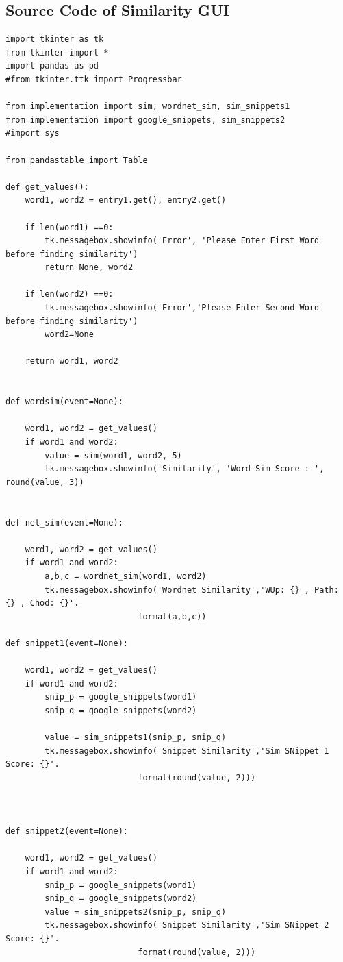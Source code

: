 \documentclass[conference]{IEEEtran}
\begin{document}
\newpage
\begin{appendices}
\section{Source Code of Similarity GUI}\label{sec:append}
\begin{lstlisting}
import tkinter as tk
from tkinter import *
import pandas as pd
#from tkinter.ttk import Progressbar

from implementation import sim, wordnet_sim, sim_snippets1
from implementation import google_snippets, sim_snippets2
#import sys

from pandastable import Table

def get_values():
    word1, word2 = entry1.get(), entry2.get()
    
    if len(word1) ==0:
        tk.messagebox.showinfo('Error', 'Please Enter First Word before finding similarity')
        return None, word2
        
    if len(word2) ==0:
        tk.messagebox.showinfo('Error','Please Enter Second Word before finding similarity')
        word2=None
    
    return word1, word2
    
    
def wordsim(event=None):
    
    word1, word2 = get_values()
    if word1 and word2:
        value = sim(word1, word2, 5)
        tk.messagebox.showinfo('Similarity', 'Word Sim Score : ', round(value, 3))


def net_sim(event=None):
     
    word1, word2 = get_values()
    if word1 and word2:
        a,b,c = wordnet_sim(word1, word2)
        tk.messagebox.showinfo('Wordnet Similarity','WUp: {} , Path: {} , Chod: {}'.
                           format(a,b,c))

def snippet1(event=None):

    word1, word2 = get_values()        
    if word1 and word2:
        snip_p = google_snippets(word1)
        snip_q = google_snippets(word2)
        
        value = sim_snippets1(snip_p, snip_q)
        tk.messagebox.showinfo('Snippet Similarity','Sim SNippet 1 Score: {}'.
                           format(round(value, 2)))
     


def snippet2(event=None):

    word1, word2 = get_values()        
    if word1 and word2:
        snip_p = google_snippets(word1)
        snip_q = google_snippets(word2)
        value = sim_snippets2(snip_p, snip_q)
        tk.messagebox.showinfo('Snippet Similarity','Sim SNippet 2 Score: {}'.
                           format(round(value, 2)))




\end{lstlisting}
\end{appendices}
\end{document}
